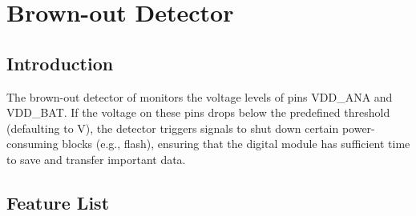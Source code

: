 \documentclass[main\_\_EN.tex]{subfiles}
\begin{document}

\ifglobal
\else
    {\let\clearpage\relax \listoftodos}
    {\let\clearpage\relax \listofdonetodos}
    \tableofcontents
\fi



\hypertarget{brownout}{}
\chapter{Brown-out Detector}
\label{mod:brownout}




\section{Introduction}

The brown-out detector of \chipname{} monitors the voltage levels of pins VDD\_ANA and VDD\_BAT. If the voltage on these pins drops below the predefined threshold (defaulting to   V), the detector triggers signals to shut down certain power-consuming blocks (e.g., flash), ensuring that the digital module has sufficient time to save and transfer important data.


\section{Feature List}
\label{sec:brownout-features}
\end{document}
